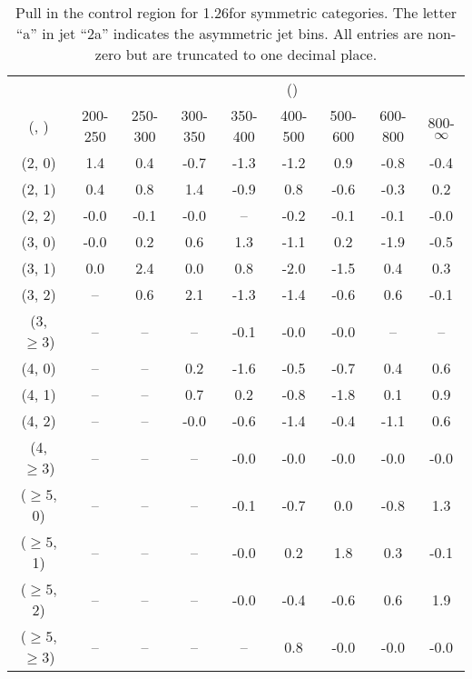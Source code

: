 \begin{table}[h!]
\tiny
\centering
\caption{Pull in the \mmj control region for 1.26\ifb for symmetric categories. The letter ``a'' in jet \eg ``2a''  indicates the asymmetric jet bins. All entries are non-zero but are truncated to one decimal place.\label{tab:pullsep_mumu_ewk_sym}}
\begin{tabular}
{ccccccccc}
	\hline\hline
&	& \multicolumn{8}{c}{\scalht (\gev)} \\ 
	 (\njet,  \nb) & 200-250 & 250-300 & 300-350 & 350-400 & 400-500 & 500-600 & 600-800 & 800-$\infty$ \\ [0.8ex] 
\hline
	(2, 0) & 1.4 & 0.4 & -0.7 & -1.3 & -1.2 & 0.9 & -0.8 & -0.4 \\[0.5ex] 
	(2, 1) & 0.4 & 0.8 & 1.4 & -0.9 & 0.8 & -0.6 & -0.3 & 0.2 \\[0.5ex] 
	(2, 2) & -0.0 & -0.1 & -0.0 & -- & -0.2 & -0.1 & -0.1 & -0.0 \\[0.5ex] 
	(3, 0) & -0.0 & 0.2 & 0.6 & 1.3 & -1.1 & 0.2 & -1.9 & -0.5 \\[0.5ex] 
	(3, 1) & 0.0 & 2.4 & 0.0 & 0.8 & -2.0 & -1.5 & 0.4 & 0.3 \\[0.5ex] 
	(3, 2) & -- & 0.6 & 2.1 & -1.3 & -1.4 & -0.6 & 0.6 & -0.1 \\[0.5ex] 
	(3, $\ge3$) & -- & -- & -- & -0.1 & -0.0 & -0.0 & -- & -- \\[0.5ex] 
	(4, 0) & -- & -- & 0.2 & -1.6 & -0.5 & -0.7 & 0.4 & 0.6 \\[0.5ex] 
	(4, 1) & -- & -- & 0.7 & 0.2 & -0.8 & -1.8 & 0.1 & 0.9 \\[0.5ex] 
	(4, 2) & -- & -- & -0.0 & -0.6 & -1.4 & -0.4 & -1.1 & 0.6 \\[0.5ex] 
	(4, $\ge3$) & -- & -- & -- & -0.0 & -0.0 & -0.0 & -0.0 & -0.0 \\[0.5ex] 
	($\ge5$, 0) & -- & -- & -- & -0.1 & -0.7 & 0.0 & -0.8 & 1.3 \\[0.5ex] 
	($\ge5$, 1) & -- & -- & -- & -0.0 & 0.2 & 1.8 & 0.3 & -0.1 \\[0.5ex] 
	($\ge5$, 2) & -- & -- & -- & -0.0 & -0.4 & -0.6 & 0.6 & 1.9 \\[0.5ex] 
	($\ge5$, $\ge3$) & -- & -- & -- & -- & 0.8 & -0.0 & -0.0 & -0.0 \\[0.5ex] 
	\hline
	\hline
\end{tabular}
\end{table}
